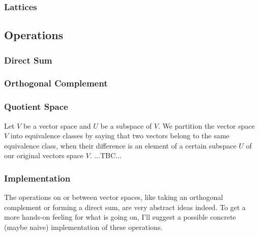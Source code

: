 

\subsubsection{Lattices}



\subsection{Operations}



\subsubsection{Direct Sum}



\subsubsection{Orthogonal Complement}





\subsubsection{Quotient Space}
Let $V$ be a vector space and $U$ be a subspace of $V$. We partition the vector space $V$ into equivalence classes by saying that two vectors belong to the same equivalence class, when their difference is an element of a certain subspace $U$ of our original vectors space $V$. ...TBC...




\subsubsection{Implementation}
The operations on or between vector spaces, like taking an orthogonal complement or forming a direct sum, are very abstract ideas indeed. To get a more hands-on feeling for what is going on, I'll suggest a possible concrete (maybe naive) implementation of these operations. 

